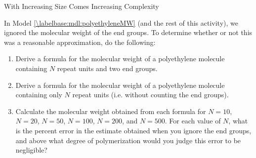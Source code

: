 \begin{activity}{With Increasing Size Comes Increasing Complexity}
\begin{exercises}
	\exercise In Model \ref{\labelbase:mdl:polyethyleneMW} (and the rest of this activity), we ignored the molecular weight of the end groups.  To determine whether or not this was a reasonable approximation, do the following:
	
		\begin{enumerate}
			
			\item Derive a formula for the molecular weight of a polyethylene molecule containing $N$  repeat units and two  end groups.
			
				\begin{solution}\end{solution}
			
			\item Derive a formula for the molecular weight of a polyethylene molecule containing only $N$  repeat units (i.e. without counting the end groups).
			
				\begin{solution}\end{solution}
			
			\item Calculate the molecular weight obtained from each formula for $N=10$, $N=20$, $N=50$, $N=100$, $N=200$, and $N=500$. For each value of $N$, what is the percent error in the estimate obtained when you ignore the end groups, and above what degree of polymerization would you judge this error to be negligible?
			
				\begin{solution}
\end{solution}
\end{enumerate}
\end{exercises}
\end{activity}
